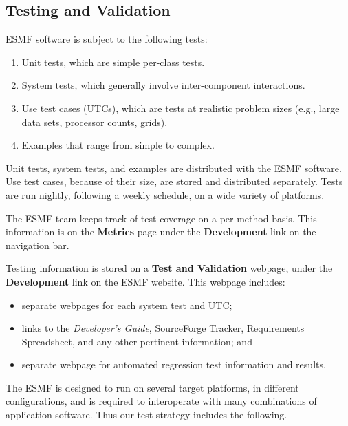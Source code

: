 
\subsection{Testing and Validation}
\label{sec:testing}

ESMF software is subject to the following tests:
\begin{enumerate}
\item Unit tests, which are simple per-class tests.
\item System tests, which generally involve inter-component interactions.
\item Use test cases (UTCs), which are tests at realistic problem
sizes (e.g., large data sets, processor counts, grids).
\item Examples that range from simple to complex.
\end{enumerate}
Unit tests, system tests, and examples are distributed with the
ESMF software.  Use test cases, because of their size, are 
stored and distributed separately.  Tests are run nightly,
following a weekly schedule, on a wide variety of platforms.  

The ESMF team keeps track of test coverage on a per-method basis.
This information is on the {\bf Metrics} page under the {\bf Development}
link on the navigation bar.

Testing information is stored on a {\bf Test and Validation} webpage,
under the {\bf Development} link on the ESMF 
website.  This webpage includes:
\begin{itemize}
\item separate webpages for each system test and UTC;
\item links to the {\it Developer's Guide}, SourceForge Tracker, Requirements 
Spreadsheet, and any other pertinent information; and
\item separate webpage for automated regression test information and results.
\end{itemize}

The ESMF is designed to run on several target platforms, in different 
configurations, and is required to interoperate with many combinations 
of application software. Thus our test strategy includes the following.

